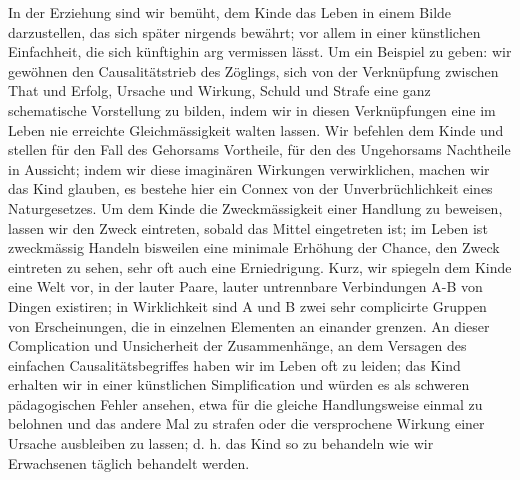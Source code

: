 In der Erziehung sind wir bemüht, dem Kinde das Leben in einem Bilde darzustellen, das sich später nirgends bewährt; vor allem in einer künstlichen Einfachheit, die sich künftighin arg vermissen lässt. Um ein Beispiel zu geben: wir gewöhnen den Causalitätstrieb des Zöglings, sich von der Verknüpfung zwischen That und Erfolg, Ursache und Wirkung, Schuld und Strafe eine ganz schematische Vorstellung zu bilden, indem wir in diesen Verknüpfungen eine im Leben nie erreichte Gleichmässigkeit walten lassen. Wir befehlen dem Kinde und stellen für den Fall des Gehorsams Vortheile, für den des Ungehorsams Nachtheile in Aussicht; indem wir diese imaginären Wirkungen verwirklichen, machen wir das Kind glauben, es bestehe hier ein Connex von der Unverbrüchlichkeit eines Naturgesetzes. Um dem Kinde die Zweckmässigkeit einer Handlung zu beweisen, lassen wir den Zweck eintreten, sobald das Mittel eingetreten ist; im Leben ist zweckmässig Handeln bisweilen eine minimale Erhöhung der Chance, den Zweck eintreten zu sehen, sehr oft auch eine Erniedrigung. Kurz, wir spiegeln dem Kinde eine Welt vor, in der lauter Paare, lauter untrennbare Verbindungen A-B von Dingen existiren; in Wirklichkeit sind A und B zwei sehr complicirte Gruppen von Erscheinungen, die in einzelnen Elementen an einander grenzen. An dieser Complication und Unsicherheit der Zusammenhänge, an dem Versagen des einfachen Causalitätsbegriffes haben wir im Leben oft zu leiden; das Kind erhalten wir in einer künstlichen Simplification und würden es als schweren pädagogischen Fehler ansehen, etwa für die gleiche Handlungsweise einmal zu belohnen und das andere Mal zu strafen oder die versprochene Wirkung einer Ursache ausbleiben zu lassen; d. h. das Kind so zu behandeln wie wir Erwachsenen täglich behandelt werden.
\par

